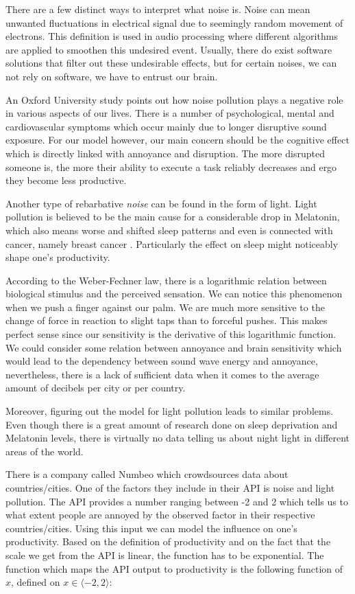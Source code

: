 There are a few distinct ways to interpret what noise is. Noise can mean unwanted fluctuations in electrical signal due to seemingly random movement of electrons. This definition is used in audio processing where different algorithms are applied to smoothen this undesired event. Usually, there do exist software solutions that filter out these undesirable effects, but for certain noises, we can not rely on software, we have to entrust our brain.


An Oxford University study \cite{Stansfeld2003} points out how noise pollution plays a negative role in various aspects of our lives. There is a number of psychological, mental and cardiovascular symptoms which occur mainly due to longer disruptive sound exposure. For our model however, our main concern should be the cognitive effect which is directly linked with annoyance and disruption. The more disrupted someone is, the more their ability to execute a task reliably decreases and ergo they become less productive. 


Another type of rebarbative \emph{noise} can be found in the form of light. Light pollution is believed to be the main cause for a considerable drop in Melatonin, which also means worse and shifted sleep patterns and even is connected with cancer, namely breast cancer \cite{Chepesiuk2009}. Particularly the effect on sleep might noticeably shape one's productivity.


According to the Weber-Fechner law, there is a logarithmic relation between biological stimulus and the perceived sensation. We can notice this phenomenon when we push a finger against our palm. We are much more sensitive to the change of force in reaction to slight taps than to forceful pushes. This makes perfect sense since our sensitivity is the derivative of this logarithmic function. We could consider some relation between annoyance and brain sensitivity which would lead to the dependency between sound wave energy and annoyance, nevertheless, there is a lack of sufficient data when it comes to the average amount of decibels per city or per country. 


Moreover, figuring out the model for light pollution leads to similar problems. Even though there is a great amount of research done on sleep deprivation and Melatonin levels, there is virtually no data telling us about night light in different areas of the world. 


There is a company called Numbeo which crowdsources data about countries/cities. One of the factors they include in their API is noise and light pollution. The API provides a number ranging between -2 and 2 which tells us to what extent people are annoyed by the observed factor in their respective countries/cities. Using this input we can model the influence on one's productivity. Based on the definition of productivity and on the fact that the scale we get from the API is linear, the function has to be exponential. The function which maps the API output to productivity is the following function of $x$, defined on $ x\in \langle -2,2\rangle$:

